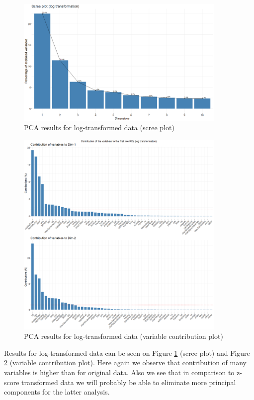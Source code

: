 \documentclass{article}
\begin{document}
	
	\begin{figure}[h]
		\centering
		\includegraphics[width=0.9\textwidth]{proj2_plots/screeplot3.png}
		\caption{PCA results for log-transformed data (scree plot)}
		\label{fig::screeplot_log}
	\end{figure}
	
	\begin{figure}[h]
		\centering
		\includegraphics[width=0.9\textwidth]{proj2_plots/varplot3.png}
		\caption{PCA results for log-transformed data (variable contribution plot)}
		\label{fig::varplot_log}
	\end{figure}
	
	Results for log-transformed data can be seen on Figure \ref{fig::screeplot_log} (scree plot) and Figure \ref{fig::varplot_log} (variable contribution plot).
	Here again we observe that contribution of many variables is higher than for original data. Also we see that in comparison to z-score transformed data we will probably be able to eliminate more principal components for the latter analysis.
	
\end{document}
